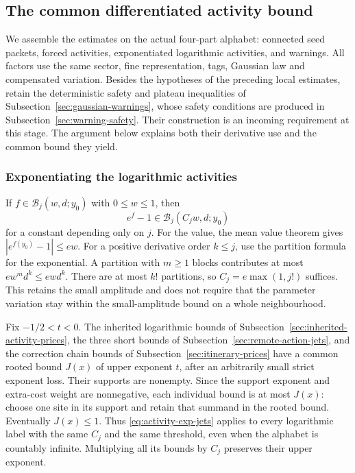 \subsection{The common differentiated activity bound}
\label{sec:activity-jet-assembly}
We assemble the estimates on the actual four-part alphabet:
connected seed packets, forced activities, exponentiated
logarithmic activities, and warnings. All factors use the same
sector, fine representation, tags, Gaussian law and compensated
variation. Besides the hypotheses of the preceding local estimates,
retain the deterministic safety and plateau inequalities of
Subsection~\ref{sec:gaussian-warnings}, whose safety conditions are
produced in Subsection~\ref{sec:warning-safety}. Their construction is an
incoming requirement at this stage. The argument below explains
both their derivative use and the common bound they yield.

\subsubsection{Exponentiating the logarithmic activities}
If $f\in\mathcal B_j(w,d;y_0)$ with $0\le w\le1$, then
\begin{equation}\label{eq:activity-exp-jets}
 e^f-1\in\mathcal B_j(C_jw,d;y_0)
\end{equation}
for a constant depending only on $j$. For the value, the mean
value theorem gives $|e^{f(y_0)}-1|\le e w$. For a positive
derivative order $k\le j$, use the partition formula for the
exponential. A partition with $m\ge1$ blocks contributes at
most $e w^m d^k\le e w d^k$. There are at most $k!$ partitions,
so $C_j=e\max(1,j!)$ suffices. This retains the small amplitude
and does not require that the parameter variation stay within
the small-amplitude bound on a whole neighbourhood.

Fix $-1/2<t<0$. The inherited logarithmic bounds of
Subsection~\ref{sec:inherited-activity-prices}, the three short
bounds of Subsection~\ref{sec:remote-action-jets}, and the correction
chain bounds of Subsection~\ref{sec:itinerary-prices} have a common
rooted bound $J(x)$ of upper exponent $t$, after an arbitrarily
small strict exponent loss. Their supports are nonempty. Since
the support exponent and extra-cost weight are nonnegative,
each individual bound is at most $J(x)$: choose one site in its
support and retain that summand in the rooted bound. Eventually
$J(x)\le1$. Thus \eqref{eq:activity-exp-jets} applies to every
logarithmic label with the same $C_j$ and the same threshold,
even when the alphabet is countably infinite. Multiplying all
its bounds by $C_j$ preserves their upper exponent.

